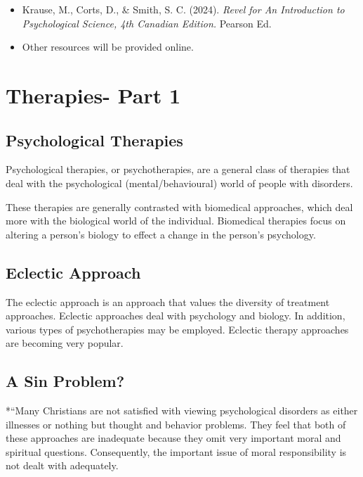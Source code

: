 \documentclass[
]{book}
\providecommand{\tightlist}{%
  \setlength{\itemsep}{0pt}\setlength{\parskip}{0pt}}
\begin{document}
\begin{itemize}
\tightlist
\item
  Krause, M., Corts, D., \& Smith, S. C. (2024). \emph{Revel for An Introduction to Psychological Science, 4th Canadian Edition.} Pearson Ed.
\item
  Other resources will be provided online.
\end{itemize}

\hypertarget{therapies--part-1}{%
\section{Therapies- Part 1}\label{therapies--part-1}}

\hypertarget{psychological-therapies}{%
\subsection*{Psychological Therapies}\label{psychological-therapies}}

Psychological therapies, or psychotherapies, are a general class of therapies that deal with the psychological (mental/behavioural) world of people with disorders.

These therapies are generally contrasted with biomedical approaches, which deal more with the biological world of the individual. Biomedical therapies focus on altering a person's biology to effect a change in the person's psychology.

\hypertarget{eclectic-approach}{%
\subsection*{Eclectic Approach}\label{eclectic-approach}}

The eclectic approach is an approach that values the diversity of treatment approaches. Eclectic approaches deal with psychology and biology. In addition, various types of psychotherapies may be employed. Eclectic therapy approaches are becoming very popular.

\hypertarget{a-sin-problem}{%
\subsection*{A Sin Problem?}\label{a-sin-problem}}

*``Many Christians are not satisfied with viewing psychological disorders as either illnesses or nothing but thought and behavior problems. They feel that both of these approaches are inadequate because they omit very important moral and spiritual questions. Consequently, the important issue of moral responsibility is not dealt with adequately.
\end{document}
